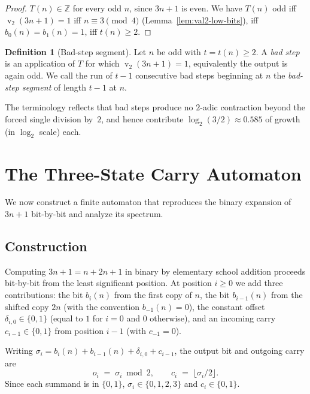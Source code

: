 \documentclass[11pt,a4paper]{article}
\theoremstyle{definition}
\newtheorem{definition}[theorem]{Definition}
\theoremstyle{remark}
\DeclareMathOperator{\val}{v}
\newcommand{\Z}{\mathbb{Z}}
\begin{document}
\begin{proof}
$T(n) \in \Z$ for every odd $n$, since $3n + 1$ is even.  We have
$T(n)$ odd iff $\val_2(3n+1) = 1$ iff $n \equiv 3 \pmod 4$
(Lemma~\ref{lem:val2-low-bits}), iff $b_0(n) = b_1(n) = 1$, iff
$t(n) \geq 2$.
\end{proof}

\begin{definition}[Bad-step segment]\label{def:badseg}
Let $n$ be odd with $t = t(n) \geq 2$.  A \emph{bad step} is an
application of $T$ for which $\val_2(3n+1) = 1$, equivalently the
output is again odd.  We call the run of $t-1$ consecutive bad steps
beginning at $n$ the \emph{bad-step segment} of length $t-1$ at $n$.
\end{definition}

The terminology reflects that bad steps produce no $2$-adic
contraction beyond the forced single division by~$2$, and hence
contribute $\log_2(3/2) \approx 0.585$ of growth (in $\log_2$ scale)
each.

\section{The Three-State Carry Automaton}\label{sec:automaton}

We now construct a finite automaton that reproduces the binary expansion
of $3n + 1$ bit-by-bit and analyze its spectrum.

\subsection{Construction}\label{sec:constr}

Computing $3n + 1 = n + 2n + 1$ in binary by elementary school addition
proceeds bit-by-bit from the least significant position.  At position
$i \geq 0$ we add three contributions: the bit $b_i(n)$ from the first
copy of $n$, the bit $b_{i-1}(n)$ from the shifted copy $2n$ (with the
convention $b_{-1}(n) = 0$), the constant offset
$\delta_{i,0} \in \{0, 1\}$ (equal to $1$ for $i = 0$ and $0$
otherwise), and an incoming carry $c_{i-1} \in \{0, 1\}$ from position
$i-1$ (with $c_{-1} = 0$).

Writing $\sigma_i = b_i(n) + b_{i-1}(n) + \delta_{i,0} + c_{i-1}$, the
output bit and outgoing carry are
\begin{equation}\label{eq:bitop}
  o_i \;=\; \sigma_i \bmod 2,
  \qquad
  c_i \;=\; \lfloor \sigma_i / 2 \rfloor.
\end{equation}
Since each summand is in $\{0, 1\}$, $\sigma_i \in \{0, 1, 2, 3\}$ and
$c_i \in \{0, 1\}$.
\end{document}
